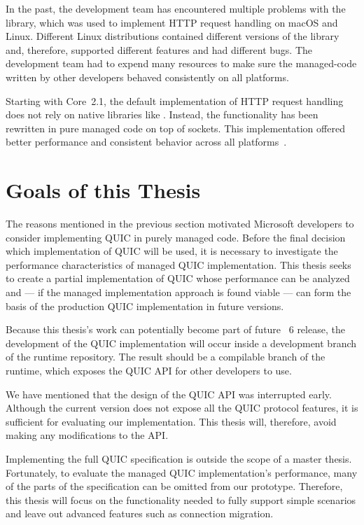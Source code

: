 In the past, the \dotnet{} development team has encountered multiple problems with the
\libcurl~\cite{curlGithub} library, which was used to implement HTTP request handling on macOS and
Linux. Different Linux distributions contained different versions of the \libcurl{} library and,
therefore, supported different features and had different bugs. The \dotnet{} development team had
to expend many resources to make sure the \gls{managed-code} written by other \dotnet{} developers
behaved consistently on all platforms.

Starting with \dotnet{} Core~2.1, the default implementation of HTTP request handling does not rely
on native libraries like \libcurl{}. Instead, the functionality has been rewritten in pure managed
code on top of sockets. This implementation offered better performance and consistent behavior
across all \dotnet{} platforms~\cite{SocketsHttpHandlerDocs}.

\section{Goals of this Thesis}

The reasons mentioned in the previous section motivated Microsoft developers to consider
implementing QUIC in purely managed \csharp{} code. Before the final decision which implementation
of QUIC will be used, it is necessary to investigate the performance characteristics of managed QUIC
implementation. This thesis seeks to create a partial implementation of QUIC whose performance can
be analyzed and --- if the managed implementation approach is found viable --- can form the basis of the
production QUIC implementation in future \dotnet{} versions.

Because this thesis's work can potentially become part of future \dotnet{}~6 release, the
development of the QUIC implementation will occur inside a development branch of the \dotnet{}
runtime repository. The result should be a compilable branch of the runtime, which exposes the QUIC
API for other \dotnet{} developers to use.

We have mentioned that the design of the QUIC API was interrupted early. Although the current
version does not expose all the QUIC protocol features, it is sufficient for evaluating our
implementation. This thesis will, therefore, avoid making any modifications to the API\@.

Implementing the full QUIC specification is outside the scope of a master thesis. Fortunately, to
evaluate the managed QUIC implementation's performance, many of the parts of the specification can
be omitted from our prototype. Therefore, this thesis will focus on the functionality needed to
fully support simple scenarios and leave out advanced features such as connection migration.

